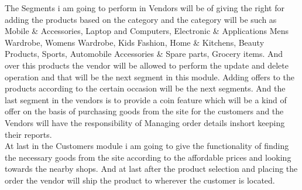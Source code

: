 \documentclass[a4paper,12pt]{report}
\begin{document}
\hspace*{12pt}The Segments i am going to perform in Vendors will be of giving the right for adding the products based on the category and the category will be such as Mobile \& Accessories, Laptop and Computers, Electronic \& Applications Mens Wardrobe, Womens Wardrobe, Kids Fashion, Home \& Kitchens, Beauty Products, Sports, Automobile Accessories \& Spare parts, Grocery items. And over this products the vendor will be allowed to perform the update and delete operation and that will be the next segment in this module. Adding offers to the products according to the certain occasion will be the next segments. And the last segment in the vendors is to provide a coin feature which will be a kind of offer on the basis of purchasing goods from the site for the customers and the Vendors will have the responsibility of Managing order details inshort keeping their reports.\\

\hspace*{12pt}At last in the Customers module i am going to give the functionality of finding the necessary goods from the site according to the affordable prices and looking towards the nearby shops. And at last after the product selection and placing the order the vendor will ship the product to wherever the customer is located.

  
\end{document}
